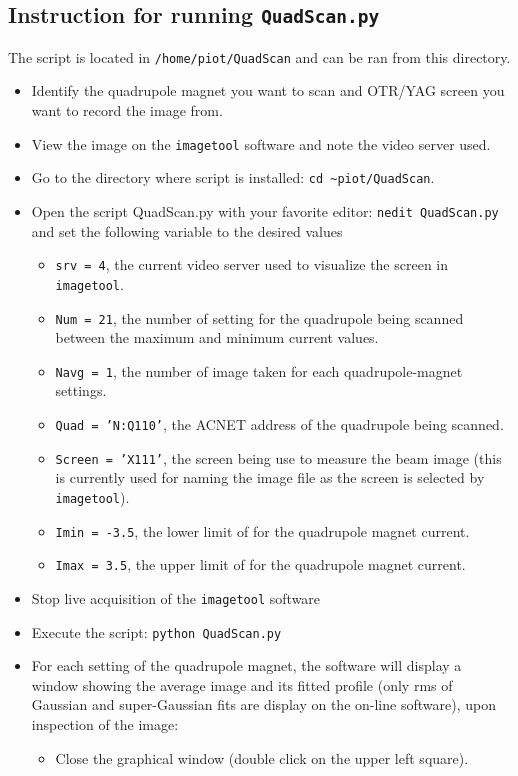 \documentclass[notitlepage,twocolumn,nofootinbib,showpacs,preprintnumbers,superscriptaddress,amsmath,amssymb]{revtex4-1}
\begin{document}
\subsection{Instruction for running {\tt QuadScan.py}}
%
The script is located in {\tt /home/piot/QuadScan} and can be ran from this directory. 
\begin{itemize}
\item Identify the quadrupole magnet you want to scan and OTR/YAG screen you want to record the image from.
\item View the image on the {\tt imagetool} software and note the video server used. 
\item Go to the directory where script is installed: {\tt cd \~{}piot/QuadScan}. 
\item Open the script QuadScan.py with your favorite editor: {\tt nedit QuadScan.py} and set the following variable to the desired values
\begin{itemize}
\item {\tt srv = 4}, the current video server used to visualize the screen in {\tt imagetool}.
\item {\tt Num  = 21}, the number of setting for the quadrupole being scanned between the maximum and minimum current values. 
\item {\tt Navg = 1}, the number of image taken for each quadrupole-magnet settings.
\item {\tt Quad = 'N:Q110'}, the ACNET address of the quadrupole being scanned. 
\item {\tt Screen = 'X111'}, the screen being use to measure the beam image (this is currently used for naming the image file as the screen is selected by {\tt imagetool}).
\item {\tt Imin =  -3.5}, the lower limit of for the quadrupole magnet current. 
\item {\tt Imax =   3.5}, the upper limit of for the quadrupole magnet current. 
\end{itemize}
\item Stop live acquisition of the {\tt imagetool} software
\item Execute the script: {\tt python QuadScan.py} 
\item For each setting of the quadrupole magnet, the software will display a window showing the average image and its fitted profile (only rms of Gaussian and super-Gaussian fits are display on the  on-line software), upon inspection of the image:
\begin{itemize}
\item Close the graphical window (double click on the upper left square).

\end{itemize}
\end{itemize}
\end{document}
